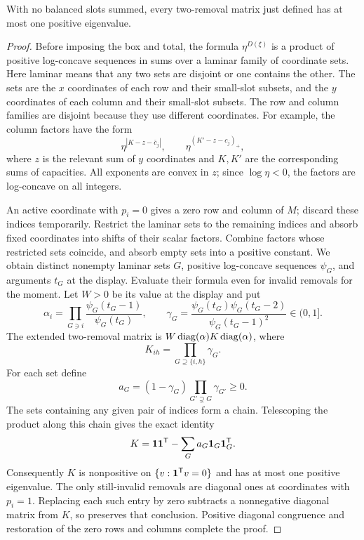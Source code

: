 \begin{lemma}\label{lem:laminar-signature}
With no balanced slots summed, every two-removal matrix just defined has
at most one positive eigenvalue.
\end{lemma}
\begin{proof}
Before imposing the box and total, the formula $\eta^{D(\xi)}$ is a
product of positive log-concave sequences in sums over a laminar family
of coordinate sets.  Here laminar means that any two sets are disjoint
or one contains the other.  The sets are the $x$ coordinates of each row
and their small-slot subsets, and the $y$ coordinates of each column and
their small-slot subsets.  The row and column families are disjoint
because they use different coordinates.  For example, the column
factors have the form
\[
 \eta^{|K-z-\bar c_j|},\qquad
 \eta^{(K'-z-c_j)_+},
\]
where $z$ is the relevant sum of $y$ coordinates and $K,K'$ are the
corresponding sums of capacities.  All exponents are convex in $z$;
since $\log\eta<0$, the factors are log-concave on all integers.

An active coordinate with $p_i=0$ gives a zero row and column of $M$;
discard these indices temporarily.  Restrict the laminar sets to the
remaining indices and absorb fixed coordinates into shifts of their
scalar factors.  Combine factors whose restricted sets coincide, and
absorb empty sets into a positive constant.  We obtain distinct
nonempty laminar sets $G$, positive log-concave sequences $\psi_G$, and
arguments $t_G$ at the display.  Evaluate their formula even for invalid
removals for the moment.  Let $W>0$ be its value at the display and put
\[
 \alpha_i=\prod_{G\ni i}\frac{\psi_G(t_G-1)}{\psi_G(t_G)},
 \qquad
 \gamma_G=\frac{\psi_G(t_G)\psi_G(t_G-2)}{\psi_G(t_G-1)^2}\in(0,1].
\]
The extended two-removal matrix is
$W\operatorname{diag}(\alpha)K\operatorname{diag}(\alpha)$, where
\[
 K_{ih}=\prod_{G\supseteq\{i,h\}}\gamma_G.
\]
For each set define
\[
 a_G=(1-\gamma_G)\prod_{G'\supsetneq G}\gamma_{G'}\ge0.
\]
The sets containing any given pair of indices form a chain.  Telescoping
the product along this chain gives the exact identity
\begin{equation}\label{eq:laminar-blocks}
 K=\mathbf{1}\mathbf{1}^{\mathsf T}
       -\sum_G a_G\mathbf{1}_G\mathbf{1}_G^{\mathsf T}.
\end{equation}
Consequently $K$ is nonpositive on $\{v:\mathbf{1}^{\mathsf T}v=0\}$ and
has at most one positive eigenvalue.  The only still-invalid removals
are diagonal ones at coordinates with $p_i=1$.  Replacing each such
entry by zero subtracts a nonnegative diagonal matrix from $K$, so preserves
that conclusion.  Positive diagonal congruence and restoration of the
zero rows and columns complete the proof.
\end{proof}

